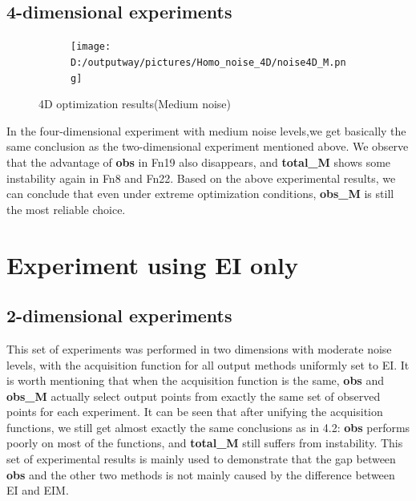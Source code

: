 \documentclass{article}
\begin{document}
\subsection{4-dimensional experiments}

\begin{figure}[H]
    \centering
    \begin{subfigure}[t]{1\linewidth}
        \centering
        \texttt{[image: D:/outputway/pictures/Homo\_noise\_4D/noise4D\_M.png]}
    \end{subfigure}
    \caption{4D optimization results(Medium noise)}
    \label{Fig8}
\end{figure}

\hspace{2em}In the four-dimensional experiment with medium noise levels,we get basically the same conclusion as the two-dimensional experiment mentioned above. We observe that the advantage of \textbf{obs} in Fn19 also disappears, and \textbf{total\_M} shows some instability again in Fn8 and Fn22. Based on the above experimental results, we can conclude that even under extreme optimization conditions, \textbf{obs\_M} is still the most reliable choice.

\section{Experiment using EI only}
\subsection{2-dimensional experiments}
\hspace{2em}This set of experiments was performed in two dimensions with moderate noise levels, with the acquisition function for all output methods uniformly set to EI. It is worth mentioning that when the acquisition function is the same, \textbf{obs} and \textbf{obs\_M} actually select output points from exactly the same set of observed points for each experiment. It can be seen that after unifying the acquisition functions, we still get almost exactly the same conclusions as in 4.2: \textbf{obs} performs poorly on most of the functions, and \textbf{total\_M} still suffers from instability. This set of experimental results is mainly used to demonstrate that the gap between \textbf{obs}  and the other two methods is not mainly caused by the difference between EI and EIM.
\end{document}
